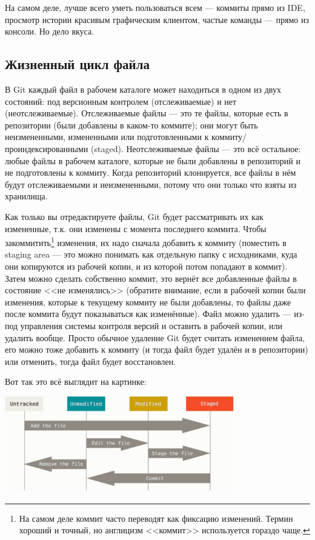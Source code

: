 \documentclass{../text-style}
\begin{document}
На самом деле, лучше всего уметь пользоваться всем --- коммиты прямо из IDE, просмотр истории красивым графическим клиентом, частые команды --- прямо из консоли. Но дело вкуса.

\subsection{Жизненный цикл файла}

В Git каждый файл в рабочем каталоге может находиться в одном из двух состояний: под версионным контролем (отслеживаемые) и нет (неотслеживаемые). Отслеживаемые файлы --- это те файлы, которые есть в репозитории (были добавлены в каком-то коммите); они могут быть неизмененными, измененными или подготовленными к коммиту/проиндексированными (staged). Неотслеживаемые файлы --- это всё остальное: любые файлы в рабочем каталоге, которые не были добавлены в репозиторий и не подготовлены к коммиту. Когда репозиторий клонируется, все файлы в нём будут отслеживаемыми и неизмененными, потому что они только что взяты из хранилища.

Как только вы отредактируете файлы, Git будет рассматривать их как измененные, т.к. они изменены с момента последнего коммита. Чтобы закоммитить\footnote{На самом деле коммит часто переводят как фиксацию изменений. Термин хороший и точный, но англицизм <<коммит>> используется гораздо чаще.} изменения, их надо сначала добавить к коммиту (поместить в staging area --- это можно понимать как отдельную папку с исходниками, куда они копируются из рабочей копии, и из которой потом попадают в коммит). Затем можно сделать собственно коммит, это вернёт все добавленные файлы в состояние <<не изменялись>> (обратите внимание, если в рабочей копии были изменения, которые к текущему коммиту не были добавлены, то файлы даже после коммита будут показываться как изменённые). Файл можно удалить --- из-под управления системы контроля версий и оставить в рабочей копии, или удалить вообще. Просто обычное удаление Git будет считать изменением файла, его можно тоже добавить к коммиту (и тогда файл будет удалён и в репозитории) или отменить, тогда файл будет восстановлен. 

Вот так это всё выглядит на картинке:

\begin{center}
    \includegraphics[width=0.75\textwidth]{fileLifeCycle.png}
\end{center}
\end{document}
